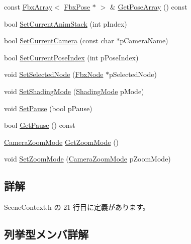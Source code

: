 \begin{DoxyCompactItemize}
\item 
const \hyperlink{class_fbx_array}{Fbx\+Array}$<$ \hyperlink{class_fbx_pose}{Fbx\+Pose} $\ast$ $>$ \& \hyperlink{class_scene_context_a963c3d4a2d7956bc15ee3dead095fef3}{Get\+Pose\+Array} () const
\item 
bool \hyperlink{class_scene_context_a003a522965333e080d2ac5e8d3e0163e}{Set\+Current\+Anim\+Stack} (int p\+Index)
\item 
bool \hyperlink{class_scene_context_a10d6a89671f4aa66719387a1299db7a9}{Set\+Current\+Camera} (const char $\ast$p\+Camera\+Name)
\item 
bool \hyperlink{class_scene_context_a2cd3263d79e2170f7ea3197186540916}{Set\+Current\+Pose\+Index} (int p\+Pose\+Index)
\item 
void \hyperlink{class_scene_context_a181d85ec09f86f556fa2d4050fa28fb8}{Set\+Selected\+Node} (\hyperlink{class_fbx_node}{Fbx\+Node} $\ast$p\+Selected\+Node)
\item 
void \hyperlink{class_scene_context_ac2719e4c499f1d811619ea21ea477392}{Set\+Shading\+Mode} (\hyperlink{_gl_functions_8h_a474716bb9224d44d614704a0bd331d99}{Shading\+Mode} p\+Mode)
\item 
void \hyperlink{class_scene_context_a0bb98ae02d7fd834f7cf83f79fb7e628}{Set\+Pause} (bool p\+Pause)
\item 
bool \hyperlink{class_scene_context_a4c0e12192d34a63047e3ed044565bfab}{Get\+Pause} () const
\item 
\hyperlink{class_scene_context_a06de9da0c18152a74673a8ed829abf78}{Camera\+Zoom\+Mode} \hyperlink{class_scene_context_ae0c21a6c4e0cbb7a6a531a1a5d1a9ec9}{Get\+Zoom\+Mode} ()
\item 
void \hyperlink{class_scene_context_a1e6f52aae39dab1278852e2bbe44ffb0}{Set\+Zoom\+Mode} (\hyperlink{class_scene_context_a06de9da0c18152a74673a8ed829abf78}{Camera\+Zoom\+Mode} p\+Zoom\+Mode)
\end{DoxyCompactItemize}


\subsection{詳解}


 Scene\+Context.\+h の 21 行目に定義があります。



\subsection{列挙型メンバ詳解}
\mbox{\label{class_scene_context_a06de9da0c18152a74673a8ed829abf78}} 
